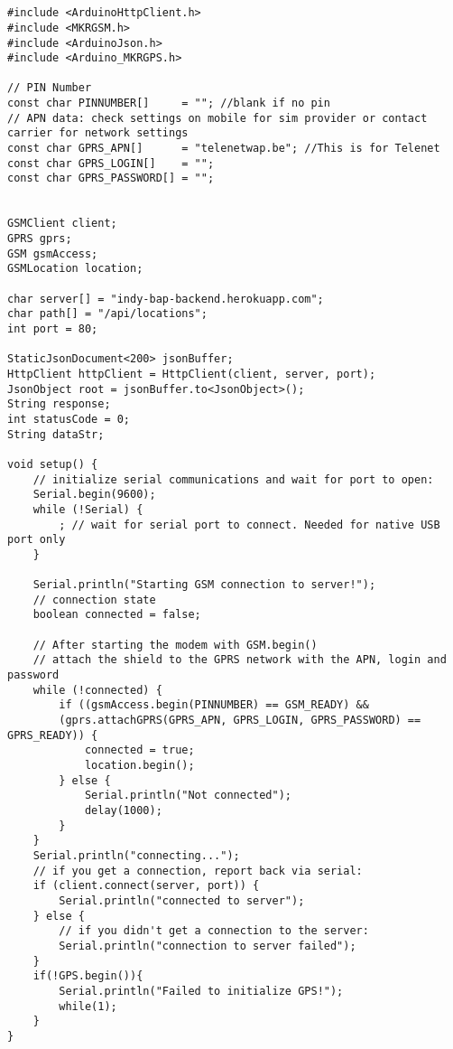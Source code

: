\chapter{}
\label{ch:broncode_arduino}
\begin{verbatim}
#include <ArduinoHttpClient.h>
#include <MKRGSM.h>
#include <ArduinoJson.h>
#include <Arduino_MKRGPS.h>

// PIN Number
const char PINNUMBER[]     = ""; //blank if no pin
// APN data: check settings on mobile for sim provider or contact carrier for network settings
const char GPRS_APN[]      = "telenetwap.be"; //This is for Telenet
const char GPRS_LOGIN[]    = ""; 
const char GPRS_PASSWORD[] = "";


GSMClient client;
GPRS gprs;
GSM gsmAccess;
GSMLocation location;

char server[] = "indy-bap-backend.herokuapp.com";
char path[] = "/api/locations";
int port = 80;

StaticJsonDocument<200> jsonBuffer;
HttpClient httpClient = HttpClient(client, server, port);
JsonObject root = jsonBuffer.to<JsonObject>();
String response;
int statusCode = 0;
String dataStr;

void setup() {
	// initialize serial communications and wait for port to open:
	Serial.begin(9600);
	while (!Serial) {
		; // wait for serial port to connect. Needed for native USB port only
	}
	
	Serial.println("Starting GSM connection to server!");
	// connection state
	boolean connected = false;
	
	// After starting the modem with GSM.begin()
	// attach the shield to the GPRS network with the APN, login and password
	while (!connected) {
		if ((gsmAccess.begin(PINNUMBER) == GSM_READY) &&
		(gprs.attachGPRS(GPRS_APN, GPRS_LOGIN, GPRS_PASSWORD) == GPRS_READY)) {
			connected = true;
			location.begin();
		} else {
			Serial.println("Not connected");
			delay(1000);
		}
	}
	Serial.println("connecting...");
	// if you get a connection, report back via serial:
	if (client.connect(server, port)) {
		Serial.println("connected to server");
	} else {
		// if you didn't get a connection to the server:
		Serial.println("connection to server failed");
	}
	if(!GPS.begin()){
		Serial.println("Failed to initialize GPS!");
		while(1);      
	}
}


\end{verbatim}
